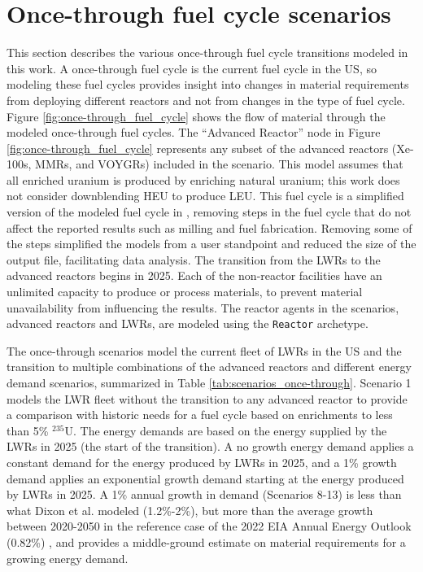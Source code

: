 \section{Once-through fuel cycle scenarios} \label{sec:once-through-methods}
This section describes the various once-through fuel cycle transitions 
modeled in this work. A once-through fuel cycle is the current 
fuel cycle in the US, so modeling these fuel cycles provides insight 
into changes in material requirements from deploying different 
reactors and not from changes in the type of fuel cycle.
Figure \ref{fig:once-through_fuel_cycle} shows the flow of material through 
the modeled once-through fuel cycles. The 
``Advanced Reactor'' node in Figure 
\ref{fig:once-through_fuel_cycle} represents any subset of the advanced 
reactors (Xe-100s, \glspl{MMR}, and VOYGRs) included 
in the scenario. This model assumes that all enriched uranium is produced 
by enriching natural uranium; this work does not consider downblending \gls{HEU} 
to produce \gls{LEU}. 
This fuel cycle is a simplified version of the modeled fuel cycle in 
\cite{bachmann_enrichment_2021}, removing steps in the fuel cycle that 
do not affect the reported results such as milling and fuel fabrication. 
Removing some of the steps simplified 
the models from a user standpoint and reduced the size of the \Cyclus 
output file, facilitating data analysis. The transition from the 
\glspl{LWR} to the advanced reactors begins in 2025. Each of the non-reactor 
facilities have an unlimited capacity to produce or process materials,
to prevent material unavailability from influencing the results. 
The reactor agents in the scenarios, 
advanced reactors and \glspl{LWR}, are modeled using the \Cycamore 
\texttt{Reactor} archetype.



The once-through scenarios model the current fleet of \glspl{LWR} in the 
US and the transition to multiple combinations of the advanced reactors 
and different energy demand scenarios, summarized in Table 
\ref{tab:scenarios_once-through}. Scenario 1 models the \gls{LWR} fleet 
without the transition to any advanced reactor to provide a comparison with 
historic needs for a fuel cycle based on enrichments to less than 5\% $^{235}$U. 
The energy demands are based on the energy supplied by the \glspl{LWR} in 
2025 (the start of the transition). A no growth energy demand applies a 
constant demand for the energy produced by \glspl{LWR} in 2025, and a 1\% 
growth demand applies an exponential growth demand starting at the energy 
produced by \glspl{LWR} in 2025. A 1\% annual growth in demand (Scenarios 8-13) 
is less than what Dixon et al. \cite{dixon_estimated_2022} modeled
(1.2\%-2\%), but more than the average growth between 2020-2050 in the 
reference case of the 2022 \gls{EIA} Annual Energy Outlook (0.82\%)
\cite{us_energy_information_administration_annual_2022}, and 
provides a middle-ground estimate on material requirements for a growing 
energy demand. 

